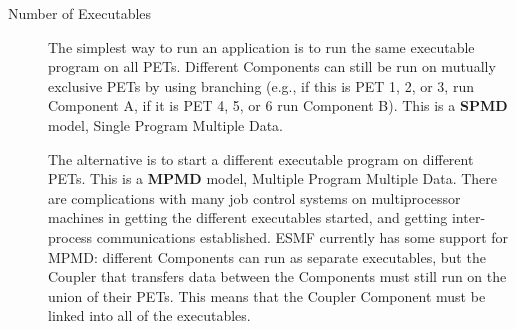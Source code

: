 \begin{description}
\item[Number of Executables]

The simplest way to run an application
is to run the same executable program on all PETs.  Different Components
can still be run on mutually exclusive PETs by using branching
(e.g., if this is PET 1, 2, or 3, run Component A, if it is
PET 4, 5, or 6 run Component B).  This is a {\bf SPMD} model, 
Single Program Multiple Data.  

The alternative is to start a different executable program on different
PETs.  This is a {\bf MPMD} model, Multiple Program Multiple Data.
There are complications with many job control systems on multiprocessor
machines in getting the different executables started, and getting
inter-process communications established.  ESMF currently has some
support for MPMD: different Components can run as separate executables,
but the Coupler that transfers data between the Components must still
run on the union of their PETs. This means that the Coupler Component
must be linked into all of the executables.

\end{description}



